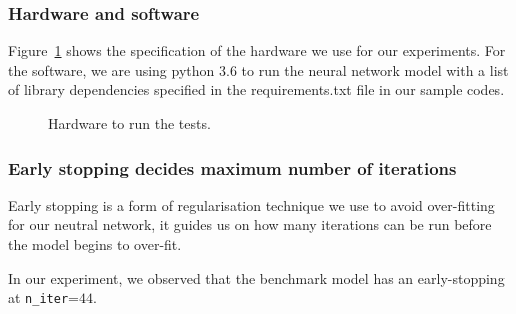 \subsubsection{Hardware and software}
Figure~\ref{fig:hardware} shows the specification of the hardware we use for our experiments.
For the software, we are using python 3.6 to run the neural network model with a list of library dependencies specified in the requirements.txt file in our sample codes.

\begin{figure}
    \caption{Hardware to run the tests.}
    \label{fig:hardware}
\end{figure}


\subsubsection{Early stopping decides maximum number of iterations}
Early stopping is a form of regularisation technique we use to avoid over-fitting for our neutral network,
it guides us on how many iterations can be run before the model begins to over-fit.

In our experiment,
we observed that the benchmark model has an early-stopping at \texttt{n\_iter}=$44$.

